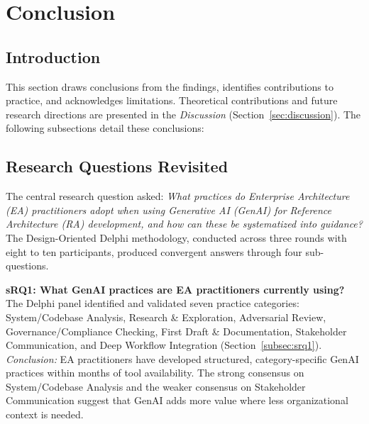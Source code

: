 
\section{Conclusion}\label{sec:conclusion}

\subsection*{Introduction}

This section draws conclusions from the findings, identifies contributions to
practice, and acknowledges limitations. Theoretical contributions and future
research directions are presented in the \textit{Discussion} (Section~\ref{sec:discussion}). The
following subsections detail these conclusions:

\localtableofcontents\clearpage

\subsection{Research Questions Revisited}\label{subsec:rqs-revisited}

The central research question asked: \textit{What practices do Enterprise
Architecture (EA) practitioners adopt when using Generative AI (GenAI) for
Reference Architecture (RA) development, and how can these be systematized into
guidance?} The Design-Oriented Delphi methodology, conducted across three
rounds with eight to ten participants, produced convergent answers through four
sub-questions.

\textbf{sRQ1: What GenAI practices are EA practitioners currently using?}
The Delphi panel identified and validated seven practice categories:
System/Codebase Analysis, Research \& Exploration, Adversarial Review,
Governance/Compliance Checking, First Draft \& Documentation, Stakeholder
Communication, and Deep Workflow Integration (Section~\ref{subsec:srq1}).
\textit{Conclusion:} EA practitioners have developed structured,
category-specific GenAI practices within months of tool availability. The strong consensus on System/Codebase Analysis and the weaker consensus on
Stakeholder Communication suggest that GenAI adds more value where less
organizational context is needed.

